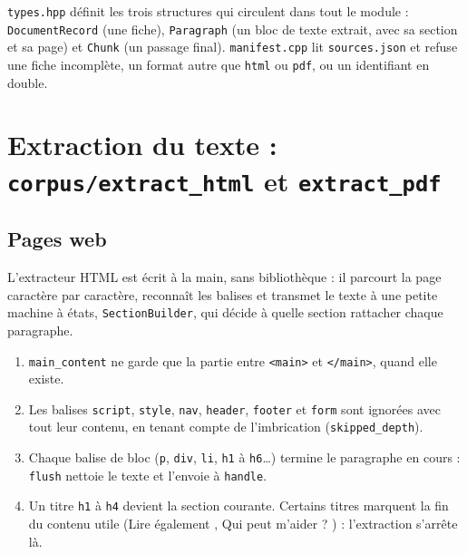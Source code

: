 \documentclass[11pt,a4paper]{article}
\newcommand{\fichier}[1]{\texttt{#1}}
\begin{document}
\fichier{types.hpp} définit les trois structures qui circulent dans tout le module : \texttt{DocumentRecord} (une fiche), \texttt{Paragraph} (un bloc de texte extrait, avec sa section et sa page) et \texttt{Chunk} (un passage final). \fichier{manifest.cpp} lit \fichier{sources.json} et refuse une fiche incomplète, un format autre que \texttt{html} ou \texttt{pdf}, ou un identifiant en double.



\section{Extraction du texte : \texttt{corpus/extract\_html} et \texttt{extract\_pdf}}

\subsection{Pages web}

L'extracteur HTML est écrit à la main, sans bibliothèque : il parcourt la page caractère par caractère, reconnaît les balises et transmet le texte à une petite machine à états, \texttt{SectionBuilder}, qui décide à quelle section rattacher chaque paragraphe.

\begin{enumerate}
  \item \texttt{main\_content} ne garde que la partie entre \texttt{<main>} et \texttt{</main>}, quand elle existe.
  \item Les balises \texttt{script}, \texttt{style}, \texttt{nav}, \texttt{header}, \texttt{footer} et \texttt{form} sont ignorées avec tout leur contenu, en tenant compte de l'imbrication (\texttt{skipped\_depth}).
  \item Chaque balise de bloc (\texttt{p}, \texttt{div}, \texttt{li}, \texttt{h1} à \texttt{h6}\dots) termine le paragraphe en cours : \texttt{flush} nettoie le texte et l'envoie à \texttt{handle}.
  \item Un titre \texttt{h1} à \texttt{h4} devient la section courante. Certains titres marquent la fin du contenu utile (\og Lire également \fg, \og Qui peut m'aider ? \fg) : l'extraction s'arrête là.
\end{enumerate}


\end{document}
